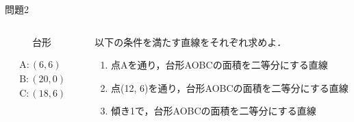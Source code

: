 \documentclass[dvipdfmx]{beamer}
\begin{document}
	\begin{frame}{問題2}
		\begin{columns}
			\begin{column}{0.5\textwidth}\centering
				\begin{figure}[htbp]
					\centering
					\caption{台形}
				\end{figure}

				\begin{gather*}
					\mathrm{A}:(6, 6)\\
					\mathrm{B}:(20, 0)\\
					\mathrm{C}:(18, 6)
				\end{gather*}
			\end{column}

			\begin{column}{0.5\textwidth}
				以下の条件を満たす直線をそれぞれ求めよ．
				\begin{enumerate}
					\item 点Aを通り，台形AOBCの面積を二等分にする直線
					\item 点(12, 6)を通り，台形AOBCの面積を二等分にする直線
					\item 傾き1で，台形AOBCの面積を二等分にする直線
				\end{enumerate}
			\end{column}

		\end{columns}
	\end{frame}
\end{document}

